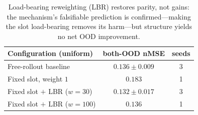 \begin{table}[t]
\centering
\small
\begin{tabular}{@{}lcc@{}}
\toprule
Configuration (uniform) & both-OOD nMSE & seeds \\
\midrule
Free-rollout baseline & $0.136\pm0.009$ & 3 \\
Fixed slot, weight $1$ & $0.183$ & 1 \\
Fixed slot $+$ LBR ($w{=}30$) & $0.132\pm0.017$ & 3 \\
Fixed slot $+$ LBR ($w{=}100$) & $0.136$ & 1 \\
\bottomrule
\end{tabular}
\caption{Load-bearing reweighting (LBR) restores parity, not gains: the mechanism's falsifiable prediction is confirmed---making the slot load-bearing removes its harm---but structure yields no net OOD improvement.}
\label{tab:lbr}
\end{table}
